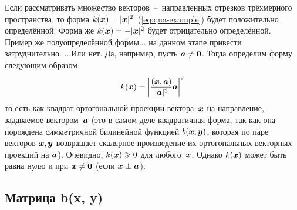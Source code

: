 \documentclass[a4paper,12pt]{article}
\begin{document}
  \begin{example}
    Если рассматривать множество векторов~--~направленных отрезков трёхмерного пространства, то форма $k(\bds x) \hm= |\bds x|^2$~(\ref{eq:qua-example}) будет положительно определённой.
    Форма же $k(\bds x) \hm= -|\bds x|^2$ будет отрицательно определённой.
    Пример же полуопределённой формы... на данном этапе привести затруднительно.
    ...Или нет.
    Да, например, пусть $\bds a \hm{\not=} \bds 0$.
    Тогда определим форму следующим образом:
    \[
      k(\boldsymbol x) = \left|\frac{(\boldsymbol x, \boldsymbol a)}{|\boldsymbol a|^2} \boldsymbol a\right|^2
    \]
    то есть как квадрат ортогональной проекции вектора~$\boldsymbol x$ на направление, задаваемое вектором~$\boldsymbol a$ (это в самом деле квадратичная форма, так как она порождена симметричной билинейной функцией $b(\boldsymbol x, \boldsymbol y)$, которая по паре векторов $\boldsymbol x, \boldsymbol y$ возвращает скалярное произведение их ортогональных векторных проекций на $\boldsymbol a$).
    Очевидно, $k(\bds x) \hm\geq 0$ для любого~$\boldsymbol x$.
    Однако $k(\boldsymbol x)$ может быть равна нулю и при $\bds x \hm{\not=} \bds 0$ (если $\bds x \hm\perp \bds a$). 
  \end{example}
  
  
  \subsection{Матрица b(x, y)}
  
\end{document}
